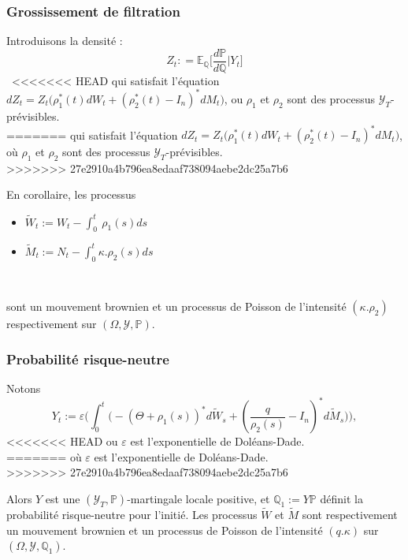 \documentclass[../finalreport.tex]{subfiles}
\makeatletter
\newcommand{\mathcenter}{\@fleqnfalse}
\makeatother
\begin{document}
\subsubsection{Grossissement de filtration}
Introduisons la densité : 
\mathcenter
\begin{equation*}
\displaystyle Z_t : = \mathbb{E}_{\mathbb{Q}}\Big[\frac{d\mathbb{P}}{d\mathbb{Q}}|Y_t\Big]
\end{equation*}
\
<<<<<<< HEAD
qui satisfait l'équation $\displaystyle dZ_t = Z_t\Big(\rho^*_1 (t) dW_t + (\rho^*_2 (t) - I_n)^* dM_t\Big)$, ou $\rho_1$ et $\rho_2$ sont des processus $\mathcal{Y}_T$-prévisibles.\\
=======
qui satisfait l'équation $\displaystyle dZ_t = Z_t\Big(\rho^*_1 (t) dW_t + (\rho^*_2 (t) - I_n)^* dM_t\Big)$, où $\rho_1$ et $\rho_2$ sont des processus $\mathcal{Y}_T$-prévisibles.\\
>>>>>>> 27e2910a4b796ea8edaaf738094aebe2dc25a7b6

En corollaire, les processus \\

\begin{itemize}
\item $\displaystyle \widetilde{W}_t := W_t - \int_{0}^{t}\ \rho_1(s) ds$\
\item $\displaystyle \widetilde{M}_t := N_t - \int_{0}^{t}\kappa.\rho_2 (s) ds$
\end{itemize}
\ 

sont un mouvement brownien et un processus de Poisson de l'intensité $(\kappa.\rho_2)$ respectivement sur $(\Omega, \mathcal{Y}, \mathbb{P})$.\\

\subsubsection{Probabilité risque-neutre}
Notons
\begin{equation*}
Y_t := \varepsilon \Big(\displaystyle \int_{0}^{t} \big(-(\Theta + \rho_1(s))^* d\widetilde{W}_s + (\frac{q}{\rho_2(s)} - I_n )^* d\widetilde{M}_s\big)\Big), 
\end{equation*}
<<<<<<< HEAD
ou $\varepsilon$ est l'exponentielle de Doléans-Dade. \\
=======
où $\varepsilon$ est l'exponentielle de Doléans-Dade. \\
>>>>>>> 27e2910a4b796ea8edaaf738094aebe2dc25a7b6

Alors $Y$ est une $(\mathcal{Y}_T, \mathbb{P})$-martingale locale positive, et $\mathbb{Q}_1:= Y \mathbb{P}$ définit la probabilité risque-neutre pour l'initié. Les processus $\widetilde{W}$ et $\widetilde{M}$ sont respectivement un mouvement brownien et un processus de Poisson de l'intensité $(q.\kappa)$ sur $(\Omega, \mathcal{Y}, \mathbb{Q}_1)$.\\
\end{document}
